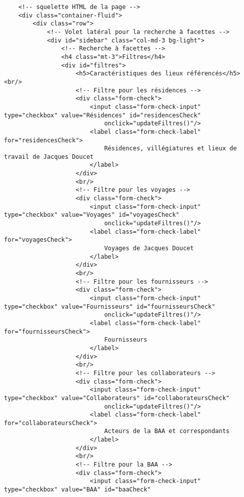 \begin{verbatim}
    <!-- squelette HTML de la page -->
    <div class="container-fluid">
        <div class="row">
            <!-- Volet latéral pour la recherche à facettes -->
            <div id="sidebar" class="col-md-3 bg-light">
                <!-- Recherche à facettes -->
                <h4 class="mt-3">Filtres</h4>
                <div id="filtres">
                    <h5>Caractéristiques des lieux référencés</h5><br/>
                    <!-- Filtre pour les résidences -->
                    <div class="form-check">
                        <input class="form-check-input" type="checkbox" value="Résidences" id="residencesCheck"
                            onclick="updateFiltres()"/>
                        <label class="form-check-label" for="residencesCheck">
                            Résidences, villégiatures et lieux de travail de Jacques Doucet
                        </label>
                    </div>
                    <br/>
                    <!-- Filtre pour les voyages -->
                    <div class="form-check">
                        <input class="form-check-input" type="checkbox" value="Voyages" id="voyagesCheck"
                            onclick="updateFiltres()"/>
                        <label class="form-check-label" for="voyagesCheck">
                            Voyages de Jacques Doucet
                        </label>
                    </div>
                    <br/>
                    <!-- Filtre pour les fournisseurs -->
                    <div class="form-check">
                        <input class="form-check-input" type="checkbox" value="Fournisseurs" id="fournisseursCheck"
                            onclick="updateFiltres()"/>
                        <label class="form-check-label" for="fournisseursCheck">
                            Fournisseurs
                        </label>
                    </div>
                    <br/>
                    <!-- Filtre pour les collaborateurs -->
                    <div class="form-check">
                        <input class="form-check-input" type="checkbox" value="Collaborateurs" id="collaborateursCheck"
                            onclick="updateFiltres()"/>
                        <label class="form-check-label" for="collaborateursCheck">
                            Acteurs de la BAA et correspondants
                        </label>
                    </div>
                    <br/>
                    <!-- Filtre pour la BAA -->
                    <div class="form-check">
                        <input class="form-check-input" type="checkbox" value="BAA" id="baaCheck"

\end{verbatim}
